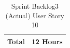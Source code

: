 \documentclass[12pt]{report}
\begin{document}
\begin{table}[h]
{\begin{tabular}{|cc|cccccc|}
\multicolumn{2}{|c|}{\textbf{Total}}                                                                                                                                                   & \multicolumn{6}{c|}{12   Hours}                                                                                                                                                                                                                                                                                                                                                                                                                                                                                                                                                                                                                                                        \\ \hline
\end{tabular}
}
\caption{Sprint Backlog3 (Actual) User Story 10}
\label{tab:mytable}
\end{table}
\end{document}
